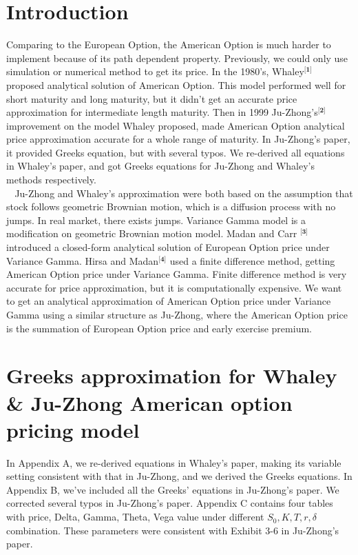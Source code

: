 \documentclass[preprint,12pt,1p]{elsarticle}
\begin{document}
\begin{spacing}{1.5}


\section{Introduction}
\label{sec1}
Comparing to the European Option, the American Option is much harder to implement because of its path dependent property. Previously, we could only use simulation or numerical method to get its price. In the 1980's, Whaley$^{\textbf{[1]}}$ proposed analytical solution of American Option. This model performed well for short maturity and long maturity, but it didn't get an accurate price approximation for intermediate length maturity. Then in 1999 Ju-Zhong's$^{\textbf{[2]}}$ improvement on the model Whaley proposed, made American Option analytical price approximation accurate for a whole range of maturity. In Ju-Zhong's paper, it provided Greeks equation, but with several typos. We re-derived all equations in Whaley's paper, and got Greeks equations for Ju-Zhong and Whaley's methods respectively. \\ 
$~~~~$Ju-Zhong and Whaley's approximation were both based on the assumption that stock follows geometric Brownian motion, which is a diffusion process with no jumps. In real market, there exists jumps. Variance Gamma model is a modification on geometric Brownian motion model. Madan and Carr $^{\textbf{[3]}}$ introduced a closed-form analytical solution of European Option price under Variance Gamma. Hirsa and Madan$^{\textbf{[4]}}$ used a finite difference method, getting American Option price under Variance Gamma. Finite difference method is very accurate for price approximation, but it is computationally expensive. We want to get an analytical approximation of American Option price under Variance Gamma using a similar structure as Ju-Zhong, where the American Option price is the summation of European Option price and early exercise premium.\\

\section{Greeks approximation for Whaley \& Ju-Zhong American option pricing model}
\label{sec2}
In Appendix A, we re-derived equations in Whaley's paper, making its variable setting consistent with that in Ju-Zhong, and we derived the Greeks equations. In Appendix B, we've included all the Greeks' equations in Ju-Zhong's paper. We corrected several typos in Ju-Zhong's paper. Appendix C contains four tables with price, Delta, Gamma, Theta, Vega value under different $S_0, K, T, r, \delta$ combination. These parameters were consistent with Exhibit 3-6 in Ju-Zhong's paper.


\end{spacing}
\end{document}
